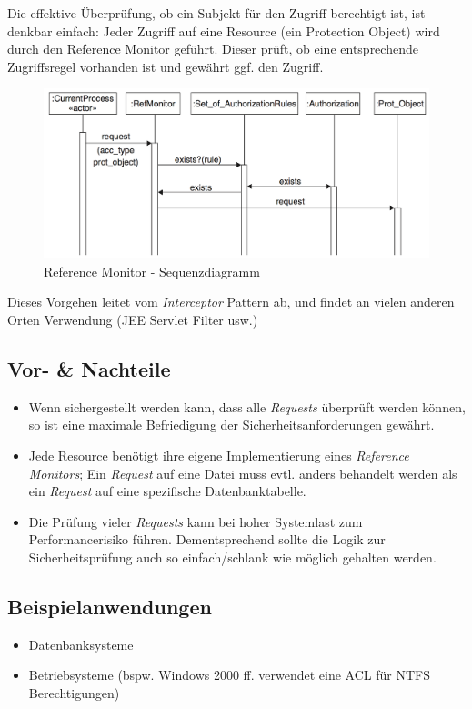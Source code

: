 Die effektive Überprüfung, ob ein Subjekt für den Zugriff berechtigt ist, ist denkbar einfach: Jeder Zugriff auf eine Resource (ein Protection Object) wird durch den Reference Monitor geführt. Dieser prüft, ob eine entsprechende Zugriffsregel vorhanden ist und gewährt ggf. den Zugriff.

\begin{figure}[H]
	\includegraphics[width=\textwidth]{content/security/accesscontrolmodels/images/referencemonitor_sequence.png}
	\caption{Reference Monitor - Sequenzdiagramm \cite{SecPatterns06}}
\end{figure}

Dieses Vorgehen leitet vom \emph{Interceptor} Pattern ab, und findet an vielen anderen Orten Verwendung (JEE Servlet Filter usw.)


\subsection*{Vor- \& Nachteile}
\begin{itemize}
	\item Wenn sichergestellt werden kann, dass alle \emph{Requests} überprüft werden können, so ist eine maximale Befriedigung der Sicherheitsanforderungen gewährt.
	\item Jede Resource benötigt ihre eigene Implementierung eines \emph{Reference Monitors}; Ein \emph{Request} auf eine Datei muss evtl. anders behandelt werden als ein \emph{Request} auf eine spezifische Datenbanktabelle.
	\item Die Prüfung vieler \emph{Requests} kann bei hoher Systemlast zum Performancerisiko führen. Dementsprechend sollte die Logik zur Sicherheitsprüfung auch so einfach/schlank wie möglich gehalten werden.
\end{itemize}

\subsection*{Beispielanwendungen}
\begin{itemize}
	\item Datenbanksysteme
	\item Betriebsysteme (bspw. Windows 2000 ff. verwendet eine ACL für NTFS Berechtigungen)
\end{itemize}